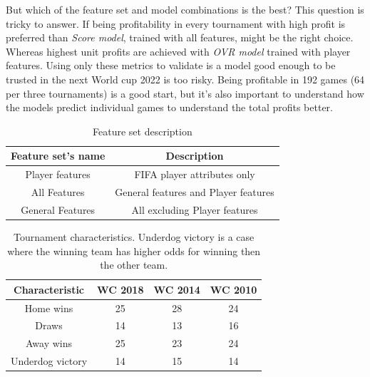 But which of the feature set and model combinations is the best? This question is tricky to answer. If being profitability in every tournament with high profit is preferred than \textit{Score model}, trained with all features, might be the right choice. Whereas highest unit profits are achieved with \textit{OVR model} trained with player features. Using only these metrics to validate is a model good enough to be trusted in the next World cup 2022 is too risky. Being profitable in 192 games (64 per three tournaments) is a good start, but it's also important to understand how the models predict individual games to understand the total profits better.

\begin{table}
    \caption{Feature set description}
    \begin{tabular}{| c | c|}
        \hline
        Feature set's name & Description \\
        \hline
        Player features & FIFA player attributes only \\
        All Features & General features and Player features \\
        General Features & All excluding Player features \\
        \hline
    \end{tabular}
    \label{table:featuresetlist}
\end{table}

\begin{table}
    \caption{Tournament characteristics. Underdog victory is a case where the winning team has higher odds for winning then the other team.}
    \begin{tabular}{| c | c|c | c|}
        \hline
        Characteristic & \textbf{WC 2018} & \textbf{WC 2014} & \textbf{WC 2010}\\
        \hline
        Home wins & 25 & 28 & 24\\
        Draws & 14 & 13 & 16\\
        Away wins & 25 & 23 & 24\\
        Underdog victory  & 14 & 15 & 14\\
        \hline
    \end{tabular}
    \label{table:tournamentcharacteristics}
\end{table}



